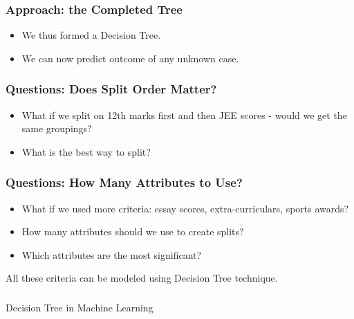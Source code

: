 \begin{frame}[fragile]\frametitle{Approach: the Completed Tree}
\begin{itemize}
	\item We thus formed a Decision Tree.
	\item We can now predict outcome of any unknown case.
	\end{itemize}

\end{frame}

\begin{frame}[fragile]\frametitle{Questions: Does Split Order Matter?}
\begin{itemize}
	\item What if we split on 12th marks first and then JEE scores - would we get the same groupings? 
	\item What is the best way to split?
	\end{itemize}
\end{frame}

\begin{frame}[fragile]\frametitle{Questions: How Many Attributes to Use?}
\begin{itemize}
	\item What if we used more criteria: essay scores, extra-curriculars, sports awards?
	\item How many attributes should we use to create splits?
	\item Which attributes are the most significant?
	\end{itemize}
All these criteria can be modeled using Decision Tree technique.
\end{frame}

\begin{frame}[fragile]\frametitle{}
\begin{center}
{\Large Decision Tree in Machine Learning}
\end{center}
\end{frame}



